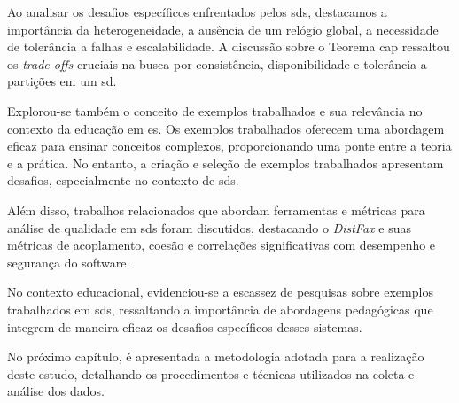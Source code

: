 Ao analisar os desafios específicos enfrentados pelos \gls{sds}, destacamos a importância da heterogeneidade, a ausência de um relógio global, a necessidade de tolerância a falhas e escalabilidade. A discussão sobre o Teorema \gls{cap} ressaltou os \textit{trade-offs} cruciais na busca por consistência, disponibilidade e tolerância a partições em um \gls{sd}.

Explorou-se também o conceito de exemplos trabalhados e sua relevância no contexto da educação em \gls{es}. Os exemplos trabalhados oferecem uma abordagem eficaz para ensinar conceitos complexos, proporcionando uma ponte entre a teoria e a prática. No entanto, a criação e seleção de exemplos trabalhados apresentam desafios, especialmente no contexto de \gls{sds}.

Além disso, trabalhos relacionados que abordam ferramentas e métricas para análise de qualidade em \gls{sds} foram discutidos, destacando o \textit{DistFax} e suas métricas de acoplamento, coesão e correlações significativas com desempenho e segurança do software.

No contexto educacional, evidenciou-se a escassez de pesquisas sobre exemplos trabalhados em \gls{sds}, ressaltando a importância de abordagens pedagógicas que integrem de maneira eficaz os desafios específicos desses sistemas.

No próximo capítulo, é apresentada a metodologia adotada para a realização deste estudo, detalhando os procedimentos e técnicas utilizados na coleta e análise dos dados.
